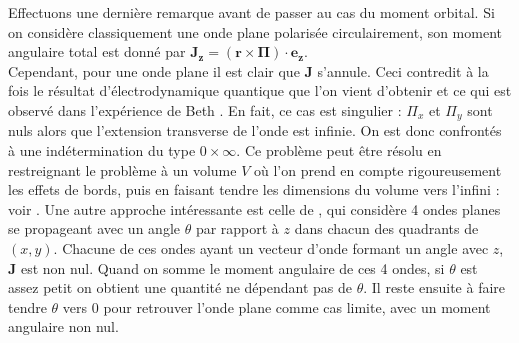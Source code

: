 Effectuons une dernière remarque avant de passer au cas du moment orbital. Si on considère classiquement une onde plane polarisée circulairement, son moment angulaire total est donné par $\bm{J_z}=(\bm{r}\times\bm{\Pi})\cdot\bm{e_z}$.\\
Cependant, pour une onde plane il est clair que $\bm{J}$ s'annule. Ceci contredit à la fois le résultat d'électrodynamique quantique que l'on vient d'obtenir et ce qui est observé dans l'expérience de Beth . En fait, ce cas est singulier : $\Pi_x$ et $\Pi_y $ sont nuls alors que l'extension transverse de l'onde est infinie. On est donc confrontés à une indétermination du type $0\times \infty$. 
Ce problème peut être résolu en restreignant le problème à un volume $V$ où l'on prend en compte rigoureusement les effets de bords, puis en faisant tendre les dimensions du volume vers l'infini : voir . Une autre approche intéressante est celle de , qui considère 4 ondes planes se propageant avec un angle $\theta$ par rapport à $z$ dans chacun des quadrants de $(x,y)$. Chacune de ces ondes ayant un vecteur d'onde formant un angle avec $z$, $\bm{J}$ est non nul. Quand on somme le moment angulaire de ces 4 ondes, si $\theta$ est assez petit on obtient une quantité ne dépendant pas de $\theta$. Il reste ensuite à faire tendre $\theta$ vers 0 pour retrouver l'onde plane comme cas limite, avec un moment angulaire non nul.

